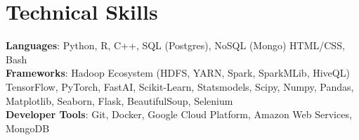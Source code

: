 \documentclass[letterpaper,11pt]{article}
\begin{document}
%
\section{Technical Skills}
 \begin{itemize}[leftmargin=0.15in, label={}]
    \small{\item{
     \textbf{Languages}{: Python, R, C++, SQL (Postgres), NoSQL (Mongo) HTML/CSS, Bash} \\
     \textbf{Frameworks}{: Hadoop Ecosystem (HDFS, YARN, Spark, SparkMLib, HiveQL) TensorFlow, PyTorch, FastAI, Scikit-Learn, Statsmodels, Scipy, Numpy, Pandas, Matplotlib, Seaborn, Flask, BeautifulSoup, Selenium} \\
     \textbf{Developer Tools}{: Git, Docker, Google Cloud Platform, Amazon Web Services, MongoDB}
    }}
 \end{itemize}


\end{document}
